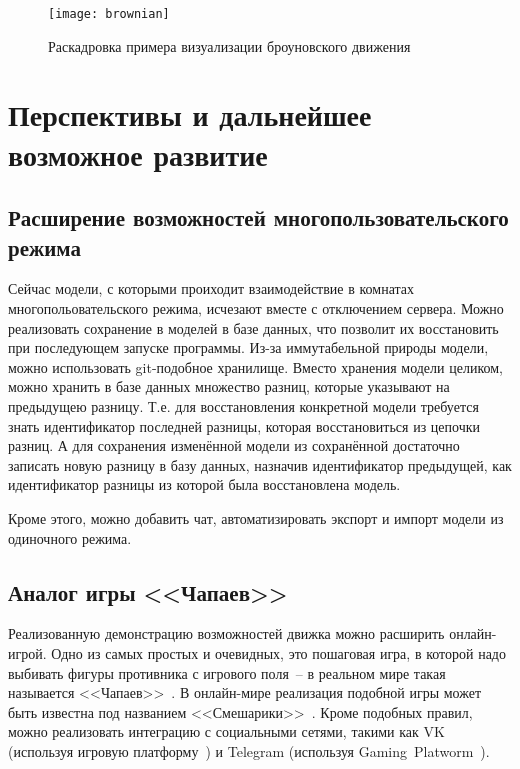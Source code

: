 \begin{figure}[H]
    \centering
    \texttt{[image: brownian]}
    \caption{Раскадровка примера визуализации броуновского движения\label{brownianfig}}
\end{figure}

\section{Перспективы и дальнейшее возможное развитие}

\subsection{Расширение возможностей многопользовательского режима}

Сейчас модели, с которыми проиходит взаимодействие в комнатах многопольовательского режима, исчезают вместе с отключением сервера.
Можно реализовать сохранение в моделей в базе данных, что позволит их восстановить при последующем запуске программы.
Из-за иммутабельной природы модели, можно использовать git-подобное хранилище.
Вместо хранения модели целиком, можно хранить в базе данных множество разниц, которые указывают на предыдущею разницу.
Т.е. для восстановления конкретной модели требуется знать идентификатор последней разницы, которая восстановиться из цепочки разниц.
А для сохранения изменённой модели из сохранённой достаточно записать новую разницу в базу данных,
назначив идентификатор предыдущей, как идентификатор разницы из которой была восстановлена модель.

Кроме этого, можно добавить чат, автоматизировать экспорт и импорт модели из одиночного режима.

\subsection{Аналог игры <<Чапаев>>}

Реализованную демонстрацию возможностей движка можно расширить онлайн-игрой.
Одно из самых простых и очевидных, это пошаговая игра, в которой надо выбивать фигуры противника с игрового поля~--
в реальном мире такая называется <<Чапаев>>~\cite{wiki-chapaev}.
В онлайн-мире реализация подобной игры может быть известна под названием <<Смешарики>>~\cite{smeshariki-fandom}.
Кроме подобных правил, можно реализовать интеграцию с социальными сетями, такими как
VK (используя игровую платформу~\cite{vk-games}) и Telegram (используя Gaming~Platworm~\cite{tg-games}).

